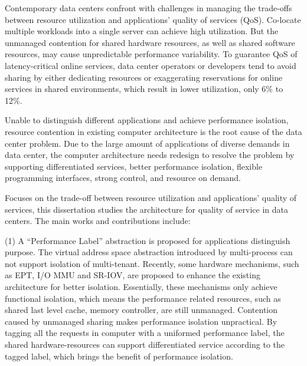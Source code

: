 
\begin{eabstract}
  Contemporary data centers confront with challenges in
  managing the trade-offs between resource utilization and
  applications’ quality of services (QoS). 
  Co-locate multiple workloads into a single server can
  achieve high utilization.
  But the unmanaged contention for shared hardware resources,
  as well as shared software resources,
  may cause unpredictable performance variability.
  To guarantee QoS of latency-critical online services,
  data center operators or developers tend to avoid sharing by
  either dedicating resources or exaggerating reservations
  for online services in shared environments,
  which result in lower utilization, only 6\% to 12\%.

  Unable to distinguish different applications and achieve performance isolation,
  resource contention in existing computer architecture is the root cause of
  the data center problem.
  Due to the large amount of applications of diverse demands in data center,
  the computer architecture needs redesign to resolve the problem
  by supporting differentiated services, better performance isolation,
  flexible programming interfaces, strong control, and resource on demand.
  
  Focuses on the trade-off between resource utilization and applications'
  quality of services, this dissertation studies the architecture for quality of service
  in data centers. The main works and contributions include:

  (1) A ``Performance Label'' abstraction is proposed
      for applications distinguish purpose.
      The virtual address space abstraction introduced by multi-process
      can not support isolation of multi-tenant.
      Recently, some hardware mechanisms, such as EPT, I/O MMU and SR-IOV,
      are proposed to enhance the existing architecture for better isolation.
      Essentially, these mechanisms only achieve functional isolation,
      which means the performance related resources,
      such as shared last level cache, memory controller, are still unmanaged.
      Contention caused by unmanaged sharing makes performance isolation unpractical.
      By tagging all the requests in computer with a uniformed performance label,
      the shared hardware-resources can support differentiated service
      according to the tagged label,
      which brings the benefit of performance isolation.


\end{eabstract}
